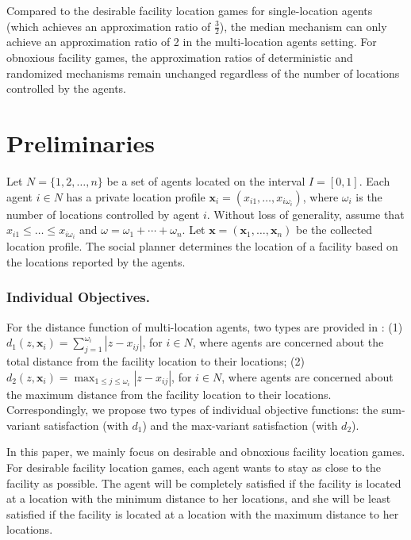 \documentclass[runningheads]{11llncst}
\begin{document}
Compared to the  desirable facility location games for single-location agents \cite{mei2019facility} (which achieves an approximation ratio of $\frac{3}{2}$), the median mechanism can only achieve an approximation ratio of 2 in the multi-location agents setting. For obnoxious facility games, the approximation ratios of deterministic and randomized mechanisms remain unchanged regardless of the number of locations controlled by the agents.

\section{Preliminaries}

Let $N=\{ 1,2,\dots,n\}$ be a set of agents located on the interval $I=[0,1]$. Each agent $i\in N$ has a private location profile $\textbf{x}_i=( x_{i1},\dots,x_{i\omega_i})$, where $\omega_i$ is the number of locations controlled by agent $i$. Without loss of generality, assume that $ x_{i1}\leq \dots\leq x_{i\omega_i}$ and $\omega=\omega_1+\cdots+\omega_n$. Let $\textbf{x}=(\textbf{x}_1,\dots,\textbf{x}_n )$ be the collected location profile. The social planner determines the location of a facility based on the locations reported by the agents. 

\subsubsection{Individual Objectives.} For the distance function of multi-location agents,  two types are provided  in \cite{procaccia2009approximate}: (1) $d_1(z,\textbf{x}_i)=\sum_{j=1}^{\omega_i}{|z-x_{ij}|}$, for $i\in N$, where agents are concerned about the total distance from the facility location to their locations; (2) $d_2(z,\textbf{x}_i)= \max_{1\leq j\leq \omega_i} {|z-x_{ij}|}$, for $i \in N$, where agents are concerned about the maximum distance from the facility location to their locations. Correspondingly, we propose two types of individual objective functions: the sum-variant satisfaction (with $d_1$) and the max-variant satisfaction (with $d_2$). 

In this paper, we mainly focus on desirable and obnoxious facility location games. For desirable facility location games, each agent wants to stay as close to the facility as possible. The agent will be completely satisfied if the facility is located at a location with  the minimum distance to her locations, and she will be least  satisfied if  the facility is located at a location with  the maximum distance to her locations. 
\end{document}
